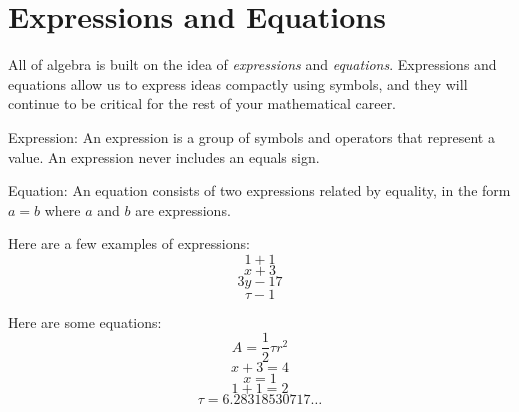 \chapter{Expressions and Equations}

All of algebra is built on the idea of \textit{expressions} and \textit{equations}.
Expressions and equations allow us to express ideas compactly using symbols, and they will continue to be critical for the rest of your mathematical career.

\begin{definition}
Expression: An expression is a group of symbols and operators that represent a value. An expression never includes an equals sign.
\end{definition}

\begin{definition}
Equation: An equation consists of two expressions related by equality, in the form $a=b$ where $a$ and $b$ are expressions.
\end{definition}

\noindent Here are a few examples of expressions:
\[1 + 1\]
\[x + 3\]
\[3y - 17\]
\[\tau - 1\]

\noindent Here are some equations:
\[A=\frac{1}{2}\tau r^{2}\]
\[x+3=4\]
\[x=1\]
\[1+1=2\]
\[\tau=6.28318530717\dots\]

